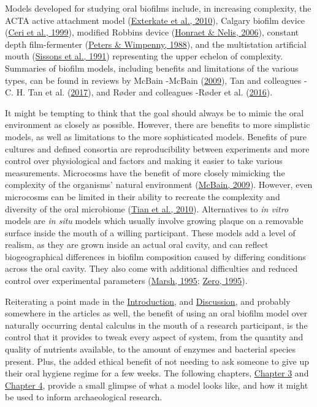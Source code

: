\documentclass[
  letterpaper,
]{book}
\begin{document}
Models developed for studying oral biofilms include, in increasing
complexity, the ACTA active attachment model
(\protect\hyperlink{ref-extercateAAA2010}{Exterkate et al., 2010}),
Calgary biofilm device
(\protect\hyperlink{ref-ceriCalgaryBiofilm1999}{Ceri et al., 1999}),
modified Robbins device
(\protect\hyperlink{ref-honraetModifiedRobbins2006}{Honraet \& Nelis,
2006}), constant depth film-fermenter
(\protect\hyperlink{ref-petersConstantDepth1988}{Peters \& Wimpenny,
1988}), and the multistation artificial mouth
(\protect\hyperlink{ref-sissonsMultistationPlaque1991}{Sissons et al.,
1991}) representing the upper echelon of complexity. Summaries of
biofilm models, including benefits and limitations of the various types,
can be found in reviews by McBain -McBain
(\protect\hyperlink{ref-mcbainBiofilmModels2009}{2009}), Tan and
colleagues -C. H. Tan et al.
(\protect\hyperlink{ref-tanAllTogether2017}{2017}), and Røder and
colleagues -Røder et al.
(\protect\hyperlink{ref-roderStudyingBacterial2016}{2016}).

It might be tempting to think that the goal should always be to mimic
the oral environment as closely as possible. However, there are benefits
to more simplistic models, as well as limitations to the more
sophisticated models. Benefits of pure cultures and defined consortia
are reproducibility between experiments and more control over
physiological and factors and making it easier to take various
measurements. Microcosms have the benefit of more closely mimicking the
complexity of the organisms' natural environment
(\protect\hyperlink{ref-mcbainBiofilmModels2009}{McBain, 2009}).
However, even microcosms can be limited in their ability to recreate the
complexity and diversity of the oral microbiome
(\protect\hyperlink{ref-tianUsingDGGE2010}{Tian et al., 2010}).
Alternatives to \emph{in vitro} models are \emph{in situ} models which
usually involve growing plaque on a removable surface inside the mouth
of a willing participant. These models add a level of realism, as they
are grown inside an actual oral cavity, and can reflect biogeographical
differences in biofilm composition caused by differing conditions across
the oral cavity. They also come with additional difficulties and reduced
control over experimental parameters
(\protect\hyperlink{ref-marshRoleMicrobiology1995}{Marsh, 1995};
\protect\hyperlink{ref-zeroSituCaries1995}{Zero, 1995}).

Reiterating a point made in the
\protect\hyperlink{chap-intro}{Introduction}, and
\protect\hyperlink{chap-discussion}{Discussion}, and probably somewhere
in the articles as well, the benefit of using an oral biofilm model over
naturally occurring dental calculus in the mouth of a research
participant, is the control that it provides to tweak every aspect of
system, from the quantity and quality of nutrients available, to the
amount of enzymes and bacterial species present. Plus, the added ethical
benefit of not needing to ask someone to give up their oral hygiene
regime for a few weeks. The following chapters,
\protect\hyperlink{byoc-valid}{Chapter 3} and
\protect\hyperlink{byoc-starch}{Chapter 4}, provide a small glimpse of
what a model looks like, and how it might be used to inform
archaeological research.
\end{document}
